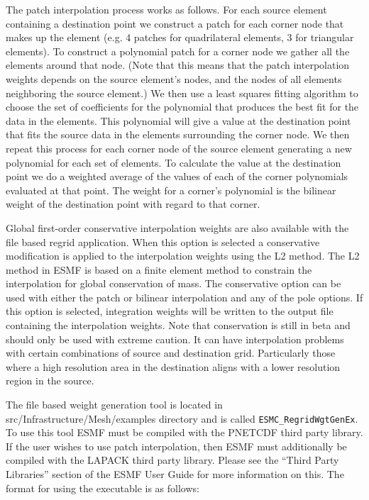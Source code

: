 The patch interpolation process works as follows. 
For each source element containing a destination point
we construct a patch for each corner node that makes up the element (e.g. 4 patches for 
quadrilateral elements, 3 for triangular elements). To construct a polynomial patch for
 a corner node we gather all the elements around that node. 
(Note that this means that the patch interpolation weights depends on the source 
element's nodes, and the nodes of all elements neighboring the source element.)  
We then use a least squares fitting algorithm to choose the set of coefficients 
for the polynomial that produces the best fit for the data in the elements. 
This polynomial will give a value at the destination point that fits the source data 
in the elements surrounding the corner node. We then repeat this process for each 
corner node of the source element generating a new polynomial for each set of elements.  
To calculate the value at the destination point we do a weighted average of the values 
of each of the corner polynomials evaluated at that point. The weight for a corner's 
polynomial is the bilinear weight of the destination point with regard to that corner.  

Global first-order conservative interpolation weights are also available with the 
file based regrid application. When this option is selected a conservative modification
is applied to the interpolation weights using the L2 method.  The L2 method in ESMF is based
on a finite element method to constrain the interpolation for global conservation of 
mass.  The conservative option can be used with either the patch or bilinear interpolation
and any of the pole options.  If this option is selected, integration weights will be
written to the output file containing the interpolation weights. 
Note that conservation is still in beta and should only be used with extreme caution.
It can have interpolation problems with certain combinations of source and destination grid. 
Particularly those where a high resolution area in the destination aligns with a lower resolution 
region in the source. 

The file based weight generation tool is located in src/Infrastructure/Mesh/examples 
directory and is called {\tt ESMC\_RegridWgtGenEx}. To use this tool ESMF must be compiled 
with the PNETCDF third party library. If the user wishes to use patch interpolation, 
then ESMF must additionally be compiled with the LAPACK third party library. Please see the 
``Third Party Libraries'' section of the ESMF User Guide for more information on this. 
The format for using the executable is as follows:

